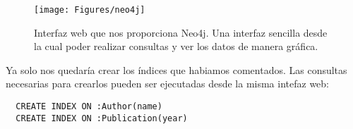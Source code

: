 \begin{figure}[H]
  \centering
    \centering
        \texttt{[image: Figures/neo4j]}
  \caption{Interfaz web que nos proporciona Neo4j. Una interfaz sencilla desde la cual poder realizar consultas y ver los datos de manera gráfica.}
\end{figure}

Ya solo nos quedaría crear los índices que habiamos comentados. Las consultas necesarias para crearlos pueden ser ejecutadas desde la misma intefaz web:

\begin{verbatim}
  CREATE INDEX ON :Author(name)
  CREATE INDEX ON :Publication(year)
\end{verbatim}


